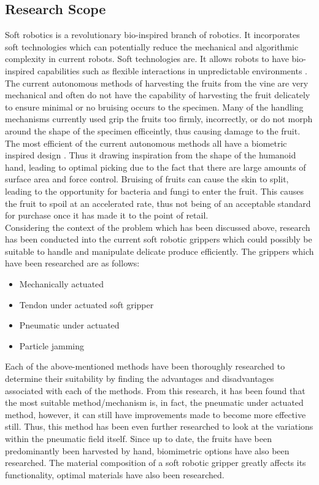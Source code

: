 \documentclass[11pt,twocolumn]{article}
\begin{document}
\subsection{Research Scope}
Soft robotics is a revolutionary bio-inspired branch of robotics. It incorporates soft technologies which can potentially reduce the mechanical and algorithmic complexity in current robots. Soft technologies are. It allows robots to have bio-inspired capabilities such as flexible interactions in unpredictable environments \cite{kim2013soft}. The current autonomous methods of harvesting the fruits from the vine are very mechanical and often do not have the capability of harvesting the fruit delicately to ensure minimal or no bruising occurs to the specimen. Many of the handling mechanisms currently used grip the fruits too firmly, incorrectly, or do not morph around the shape of the specimen efficeintly, thus causing damage to the fruit. The most efficient of the current autonomous methods all have a biometric inspired design \cite{hassan2015design}. Thus it drawing inspiration from the shape of the humanoid hand, leading to optimal picking due to the fact that there are large amounts of surface area and force control. Bruising of fruits can cause the skin to split, leading to the opportunity for bacteria and fungi to enter the fruit. This causes the fruit to spoil at an accelerated rate, thus not being of an acceptable standard for purchase once it has made it to the point of retail.
\\
\newline
Considering the context of the problem which has been discussed above, research has been conducted into the current soft robotic grippers which could possibly be suitable to handle and manipulate delicate produce efficiently. The grippers which have been researched are as follows:
\begin{itemize}
\item Mechanically actuated
\item Tendon under actuated soft gripper
\item Pneumatic under actuated
\item Particle jamming 
\end{itemize}
Each of the above-mentioned methods have been thoroughly researched to determine their suitability by finding the advantages and disadvantages associated with each of the methods. From this research, it has been found that the most suitable method/mechanism is, in fact, the pneumatic under actuated method, however, it can still have improvements made to become more effective still. Thus, this method has been even further researched to look at the variations within the pneumatic field itself. Since up to date, the fruits have been predominantly been harvested by hand, biomimetric options have also been researched. The material composition of a soft robotic gripper greatly affects its functionality, optimal materials have also been researched.
\end{document}
